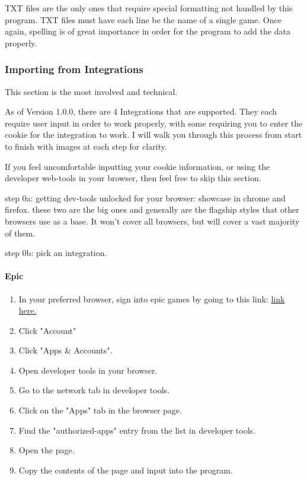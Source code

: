 
TXT files are the only ones that require special formatting not
handled by this program.
TXT files must have each line be the name of a single game. Once
again, spelling is of great importance in order for the program to
add the data properly.


\subsubsection{Importing from Integrations}

This section is the most involved and technical.

As of Version 1.0.0, there are 4 Integrations that are supported.
They each require user input in order to work properly, with some
requiring you to enter the cookie for the integration to work. I will
walk you through this process from start to finish with images at
each step for clarity.

If you feel uncomfortable inputting your cookie information, or using
the developer web-tools in your browser, then feel free to skip this section.

step 0a: getting dev-tools unlocked for your browser:
showcase in chrome and firefox. these two are the big ones and
generally are the flagship styles that other browsers use as a base.
It won't cover all browsers, but will cover a vast majority of them.

step 0b: pick an integration.


\paragraph{Epic}

\begin{enumerate}
	\item In your preferred browser, sign into epic games by going to
		this link: \href{}{link here.}
	\item Click "Account"
	\item Click "Apps \& Accounts".
	\item Open developer tools in your browser.
	\item Go to the network tab in developer tools.
	\item Click on the "Apps" tab in the browser page.
	\item Find the "authorized-apps" entry from the list in developer tools.
	\item Open the page.
	\item Copy the contents of the page and input into the program.
\end{enumerate}

